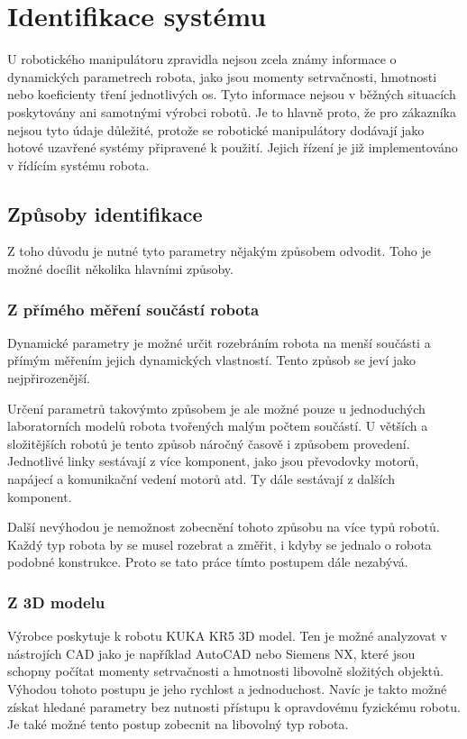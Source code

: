

\chapter{Identifikace systému}

U robotického manipulátoru zpravidla nejsou zcela známy informace o dynamických parametrech robota, jako jsou momenty setrvačnosti, hmotnosti nebo koeficienty tření jednotlivých os. Tyto informace nejsou v běžných situacích poskytovány ani samotnými výrobci robotů. Je to hlavně proto, že pro zákazníka nejsou tyto údaje důležité, protože se robotické manipulátory dodávají jako hotové uzavřené systémy připravené k použití. Jejich řízení je již implementováno v řídícím systému robota.

\section{Způsoby identifikace}

Z toho důvodu je nutné tyto parametry nějakým způsobem odvodit. Toho je možné docílit několika hlavními způsoby.

\subsection{Z přímého měření součástí robota}

Dynamické parametry je možné určit rozebráním robota na menší součásti a přímým měřením jejich dynamických vlastností. Tento způsob se jeví jako nejpřirozenější.

Určení parametrů takovýmto způsobem je ale možné pouze u jednoduchých laboratorních modelů robota tvořených malým počtem součástí. U větších a složitějších robotů je tento způsob náročný časově i způsobem provedení. Jednotlivé linky sestávají z více komponent, jako jsou převodovky motorů, napájecí a komunikační vedení motorů atd. Ty dále sestávají z dalších komponent.

Další nevýhodou je nemožnost zobecnění tohoto způsobu na více typů robotů. Každý typ robota by se musel rozebrat a změřit, i kdyby se jednalo o robota podobné konstrukce.
Proto se tato práce tímto postupem dále nezabývá.    

\subsection{Z 3D modelu}

Výrobce poskytuje k robotu KUKA KR5 3D model. Ten je možné analyzovat v nástrojích CAD jako je například AutoCAD nebo Siemens NX, které jsou schopny počítat momenty setrvačnosti a hmotnosti libovolně složitých objektů. Výhodou tohoto postupu je jeho rychlost a jednoduchost. Navíc je takto možné získat hledané parametry bez nutnosti přístupu k opravdovému fyzickému robotu. Je také možné tento postup zobecnit na libovolný typ robota.
   
